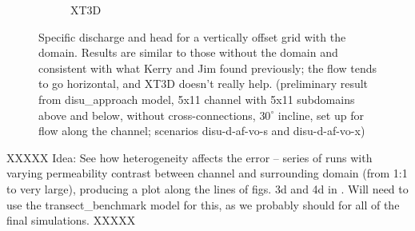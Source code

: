 \documentclass{article}
\begin{document}
\begin{figure}[H]
\begin{subfigure}{0.4\textwidth}
	\caption{XT3D}
	\label{fig:disu-x-nocc-head}
\end{subfigure}
\caption{Specific discharge and head for a vertically offset grid with the domain. Results are similar to those without the domain and consistent with what Kerry and Jim found previously; the flow tends to go horizontal, and XT3D doesn't really help. (preliminary result from disu\_approach model, 5x11 channel with 5x11 subdomains above and below, without cross-connections, $30^{\circ}$ incline, set up for flow along the channel; scenarios disu-d-af-vo-s and disu-d-af-vo-x)}
\label{fig:figures}
\end{figure}

XXXXX Idea: See how heterogeneity affects the error -- series of runs with varying permeability contrast between channel and surrounding domain (from 1:1 to very large), producing a plot along the lines of figs. 3d and 4d in \cite{bardot2022}. Will need to use the transect\_benchmark model for this, as we probably should for all of the final simulations. XXXXX
\end{document}
